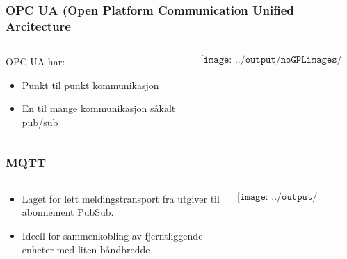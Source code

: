 \documentclass[aspectratio=169,xcolor=dvipsnames]{beamer}
\begin{document}
\begin{frame}
	\frametitle{OPC UA (Open Platform Communication Unified Arcitecture}
	\begin{columns}
		\begin{column}{0.5\textwidth}

			OPC UA har:
			\begin{itemize}
				\item Punkt til punkt kommunikasjon
				\item En til mange kommunikasjon såkalt pub/sub
			\end{itemize}

			
		\end{column}

		\begin{column}{0.5\textwidth}
	$$\texttt{[image: ../output/noGPLimages/kap5x87]}$$
		\end{column}
	\end{columns}
\end{frame}
\begin{frame}
	\frametitle{MQTT}
	\begin{columns}
		\begin{column}{0.5\textwidth}

			\begin{itemize}
				\item Laget for lett meldingstransport fra utgiver til abonnement PubSub. 
				\item Ideell for sammenkobling av fjerntliggende enheter med liten båndbredde
			\end{itemize}

			
		\end{column}

		\begin{column}{0.5\textwidth}
	$$\texttt{[image: ../output/noGPLimages/kap5x88]}$$
		\end{column}
	\end{columns}
\end{frame}
\end{document}
